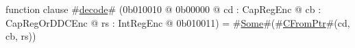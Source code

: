 function clause #\hyperref[zdecode]{decode}# (0b010010 @ 0b00000 @ cd : CapRegEnc @ cb : CapRegOrDDCEnc @ rs : IntRegEnc @ 0b010011) = #\hyperref[zSome]{Some}#(#\hyperref[zCFromPtr]{CFromPtr}#(cd, cb, rs))
